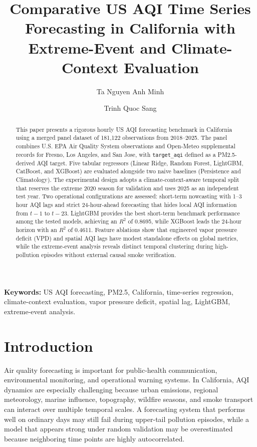 \documentclass[11pt,a4paper]{article}
\title{Comparative US AQI Time Series Forecasting in California with Extreme-Event and Climate-Context Evaluation}
\author{Ta Nguyen Anh Minh \and Trinh Quoc Sang}
\affil{FPT University}
\date{}
\begin{document}
\maketitle

\begin{abstract}
This paper presents a rigorous hourly US AQI forecasting benchmark in California using a merged panel dataset of 181,122 observations from 2018--2025. The panel combines U.S. EPA Air Quality System observations and Open-Meteo supplemental records for Fresno, Los Angeles, and San Jose, with \texttt{target\_aqi} defined as a PM2.5-derived AQI target. Five tabular regressors (Linear Ridge, Random Forest, LightGBM, CatBoost, and XGBoost) are evaluated alongside two naive baselines (Persistence and Climatology). The experimental design adopts a climate-context-aware temporal split that reserves the extreme 2020 season for validation and uses 2025 as an independent test year. Two operational configurations are assessed: short-term nowcasting with 1--3 hour AQI lags and strict 24-hour-ahead forecasting that hides local AQI information from $t-1$ to $t-23$. LightGBM provides the best short-term benchmark performance among the tested models, achieving an $R^2$ of 0.8695, while XGBoost leads the 24-hour horizon with an $R^2$ of 0.4611. Feature ablations show that engineered vapor pressure deficit (VPD) and spatial AQI lags have modest standalone effects on global metrics, while the extreme-event analysis reveals distinct temporal clustering during high-pollution episodes without external causal smoke verification.
\end{abstract}

\noindent\textbf{Keywords:} US AQI forecasting, PM2.5, California, time-series regression, climate-context evaluation, vapor pressure deficit, spatial lag, LightGBM, extreme-event analysis.

\section{Introduction}
Air quality forecasting is important for public-health communication, environmental monitoring, and operational warning systems. In California, AQI dynamics are especially challenging because urban emissions, regional meteorology, marine influence, topography, wildfire seasons, and smoke transport can interact over multiple temporal scales. A forecasting system that performs well on ordinary days may still fail during upper-tail pollution episodes, while a model that appears strong under random validation may be overestimated because neighboring time points are highly autocorrelated.
\end{document}
